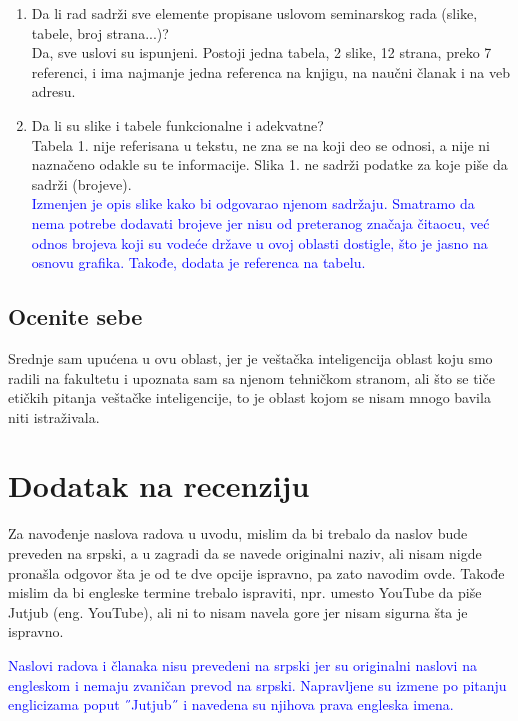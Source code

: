 \documentclass[a4paper]{report}
\newcommand{\odgovor}[1]{\textcolor{blue}{#1}}
\begin{document}
\begin{enumerate}
\item Da li rad sadrži sve elemente propisane uslovom seminarskog rada (slike, tabele, broj strana...)?\\
Da, sve uslovi su ispunjeni. Postoji jedna tabela, 2 slike, 12 strana, preko 7 referenci, i ima najmanje jedna referenca na knjigu, na naučni članak i na veb adresu.

\item Da li su slike i tabele funkcionalne i adekvatne?\\
Tabela 1. nije referisana u tekstu, ne zna se na koji deo se odnosi, a nije ni naznačeno odakle su te informacije. Slika 1. ne sadrži podatke za koje piše da sadrži (brojeve). \\
\odgovor{Izmenjen je opis slike kako bi odgovarao njenom sadržaju. Smatramo da nema potrebe dodavati brojeve jer nisu od preteranog značaja čitaocu, već odnos brojeva koji su vodeće države u ovoj oblasti dostigle, što je jasno na osnovu grafika. Takođe, dodata je referenca na tabelu.}

\end{enumerate}

\section{Ocenite sebe}
Srednje sam upućena u ovu oblast, jer je veštačka inteligencija oblast koju smo radili na fakultetu i upoznata sam sa njenom tehničkom stranom, ali što se tiče etičkih pitanja veštačke inteligencije, to je oblast kojom se nisam mnogo bavila niti istraživala. 

\chapter{Dodatak na recenziju}
Za navođenje naslova radova u uvodu, mislim da bi trebalo da naslov bude preveden na srpski, a u zagradi da se navede originalni naziv, ali nisam nigde pronašla odgovor šta je od te dve opcije ispravno, pa zato navodim ovde. Takođe mislim da bi engleske termine trebalo ispraviti, npr. umesto YouTube da piše
Jutjub (eng. YouTube), ali ni to nisam navela gore jer nisam sigurna šta je ispravno.

\odgovor{Naslovi radova i članaka nisu prevedeni na srpski jer su originalni naslovi na engleskom i nemaju zvaničan prevod na srpski. Napravljene su izmene po pitanju englicizama poput ˝Jutjub˝ i navedena su njihova prava engleska imena.}
\end{document}

